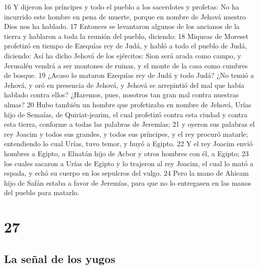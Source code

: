 16 Y dijeron los príncipes y todo el pueblo a los sacerdotes y profetas: No ha incurrido este hombre en pena de muerte, porque en nombre de Jehová nuestro Dios nos ha hablado.
17 Entonces se levantaron algunos de los ancianos de la tierra y hablaron a toda la reunión del pueblo, diciendo:
18 Miqueas de Moreset profetizó en tiempo de Ezequías rey de Judá, y habló a todo el pueblo de Judá, diciendo: Así ha dicho Jehová de los ejércitos: Sion será arada como campo, y Jerusalén vendrá a ser montones de ruinas, y el monte de la casa como cumbres de bosque. 
19 ¿Acaso lo mataron Ezequías rey de Judá y todo Judá? ¿No temió a Jehová, y oró en presencia de Jehová, y Jehová se arrepintió del mal que había hablado contra ellos? ¿Haremos, pues, nosotros tan gran mal contra nuestras almas?
20 Hubo también un hombre que profetizaba en nombre de Jehová, Urías hijo de Semaías, de Quiriat-jearim, el cual profetizó contra esta ciudad y contra esta tierra, conforme a todas las palabras de Jeremías;
21 y oyeron sus palabras el rey Joacim y todos sus grandes, y todos sus príncipes, y el rey procuró matarle; entendiendo lo cual Urías, tuvo temor, y huyó a Egipto.
22 Y el rey Joacim envió hombres a Egipto, a Elnatán hijo de Acbor y otros hombres con él, a Egipto;
23 los cuales sacaron a Urías de Egipto y lo trajeron al rey Joacim, el cual lo mató a espada, y echó su cuerpo en los sepulcros del vulgo.
24 Pero la mano de Ahicam hijo de Safán estaba a favor de Jeremías, para que no lo entregasen en las manos del pueblo para matarlo. 


\chapter{27}

\section*{La señal de los yugos}

